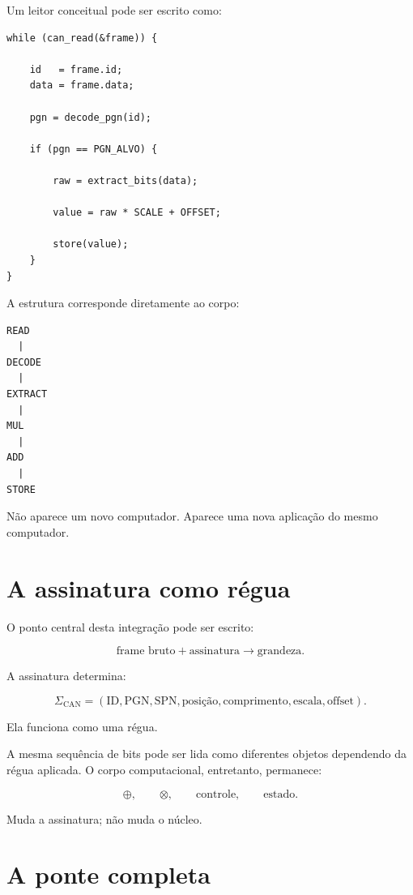 \documentclass[11pt,a4paper]{article}
\begin{document}
Um leitor conceitual pode ser escrito como:

\begin{lstlisting}
while (can_read(&frame)) {

    id   = frame.id;
    data = frame.data;

    pgn = decode_pgn(id);

    if (pgn == PGN_ALVO) {

        raw = extract_bits(data);

        value = raw * SCALE + OFFSET;

        store(value);
    }
}
\end{lstlisting}

A estrutura corresponde diretamente ao corpo:

\begin{lstlisting}
READ
  |
DECODE
  |
EXTRACT
  |
MUL
  |
ADD
  |
STORE
\end{lstlisting}

Não aparece um novo computador. Aparece uma nova aplicação do mesmo computador.


\section{A assinatura como régua}

O ponto central desta integração pode ser escrito:

\[
\boxed{
\text{frame bruto}
+
\text{assinatura}
\longrightarrow
\text{grandeza}.
}
\]

A assinatura determina:

\[
\Sigma_{\mathrm{CAN}}
=
(\mathrm{ID},\mathrm{PGN},\mathrm{SPN},
\mathrm{posição},\mathrm{comprimento},
\mathrm{escala},\mathrm{offset}).
\]

Ela funciona como uma régua.

A mesma sequência de bits pode ser lida como diferentes objetos dependendo da
régua aplicada. O corpo computacional, entretanto, permanece:

\[
\oplus,\qquad\otimes,\qquad\text{controle},\qquad\text{estado}.
\]

Muda a assinatura; não muda o núcleo.


\section{A ponte completa}
\end{document}
